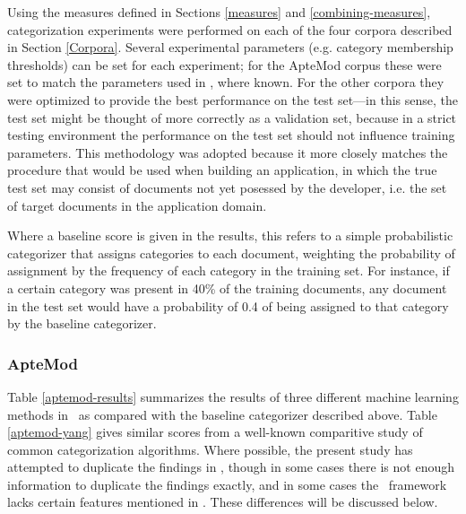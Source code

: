 Using the measures defined in Sections \ref{measures} and
\ref{combining-measures}, categorization experiments were performed on
each of the four corpora described in Section \ref{Corpora}.  Several
experimental parameters (e.g. category membership thresholds) can be
set for each experiment; for the ApteMod corpus these were set to
match the parameters used in \cite{yang:99}, where known.  For the
other corpora they were optimized to provide the
best performance on the test set---in this sense, the test set might
be thought of more correctly as a validation set, because in a strict
testing environment the performance on the test set should not
influence training parameters.  This methodology was adopted because
it more closely matches the procedure that would be used when building
an application, in which the true test set may consist of documents
not yet posessed by the developer, i.e. the set of target documents
in the application domain.

Where a baseline score is given in the results, this refers to a
simple probabilistic categorizer that assigns categories to each
document, weighting the probability of assignment by the frequency of
each category in the training set.  For instance, if a certain
category was present in 40\% of the training documents, any document
in the test set would have a probability of 0.4 of being assigned to
that category by the baseline categorizer.  

\subsubsection{ApteMod}

Table \ref{aptemod-results} summarizes the results of three different
machine learning methods in \aicat\ as compared with the baseline
categorizer described above.  Table \ref{aptemod-yang} gives similar
scores from a well-known comparitive study of common categorization
algorithms.\cite{yang:99} Where possible, the present study has
attempted to duplicate the findings in \cite{yang:99}, though in some
cases there is not enough information to duplicate the findings
exactly, and in some cases the \aicat\ framework lacks certain
features mentioned in \cite{yang:99}.  These differences will be
discussed below.


